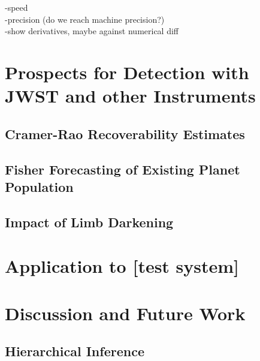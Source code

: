 \documentclass[twocolumn]{aastex631}
\begin{document}
-speed\\
-precision (do we reach machine precision?)\\
-show derivatives, maybe against numerical diff\\
\section{Prospects for Detection with JWST and other Instruments}
\label{sec:jwstdetect}

\subsection{Cramer-Rao Recoverability Estimates}
\label{sec:rec}

\subsection{Fisher Forecasting of Existing Planet Population}
\label{sec:fisherforecasting}
\subsection{Impact of Limb Darkening}
\section{Application to [test system]}
\label{sec:lctest}
\section{Discussion and Future Work}
\label{disc}
\subsection{Hierarchical Inference}

\end{document}
